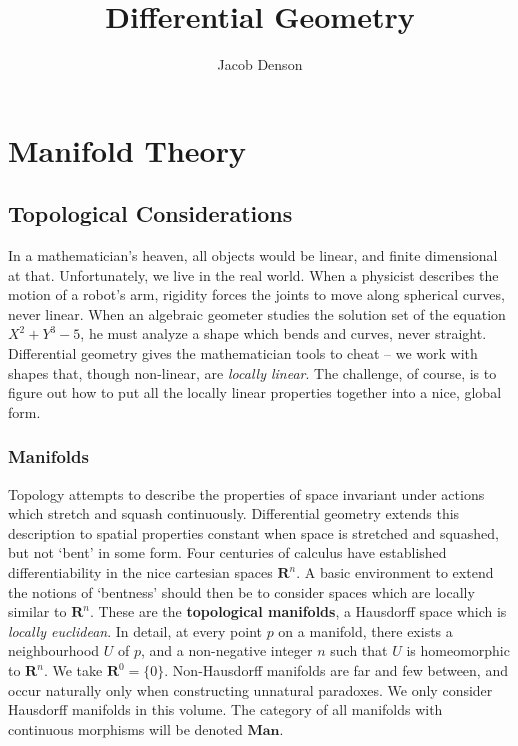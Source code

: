 

\title{Differential Geometry}
\author{Jacob Denson}



\maketitle
\tableofcontents
{}

\part{Manifold Theory}

\chapter{Topological Considerations}

In a mathematician's heaven, all objects would be linear, and finite dimensional at that. Unfortunately, we live in the real world. When a physicist describes the motion of a robot's arm, rigidity forces the joints to move along spherical curves, never linear. When an algebraic geometer studies the solution set of the equation $X^2 + Y^3 - 5$, he must analyze a shape which bends and curves, never straight. Differential geometry gives the mathematician tools to cheat -- we work with shapes that, though non-linear, are {\it locally linear}. The challenge, of course, is to figure out how to put all the locally linear properties together into a nice, global form.

\section{Manifolds}

Topology attempts to describe the properties of space invariant under actions which stretch and squash continuously. Differential geometry extends this description to spatial properties constant when space is stretched and squashed, but not `bent' in some form. Four centuries of calculus have established differentiability in the nice cartesian spaces $\mathbf{R}^n$. A basic environment to extend the notions of `bentness' should then be to consider spaces which are locally similar to $\mathbf{R}^n$. These are the {\bf topological manifolds}, a Hausdorff space which is {\it locally euclidean}. In detail, at every point $p$ on a manifold, there exists a neighbourhood $U$ of $p$, and a non-negative integer $n$ such that $U$ is homeomorphic to $\mathbf{R}^n$. We take $\mathbf{R}^0 = \{ 0 \}$. Non-Hausdorff manifolds are far and few between, and occur naturally only when constructing unnatural paradoxes. We only consider Hausdorff manifolds in this volume. The category of all manifolds with continuous morphisms will be denoted $\textbf{Man}$.

